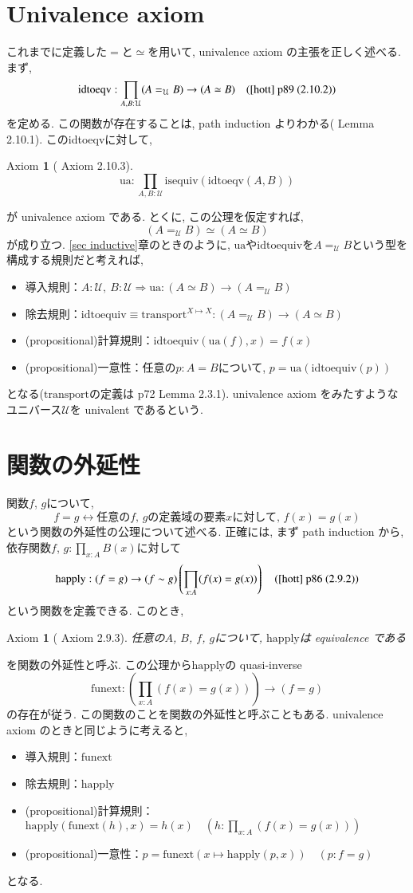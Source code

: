 \documentclass[11pt]{jsreport}
\theoremstyle{mystyle}
\newtheorem{axi}[df]{$\textrm{Axiom}$}
\newcommand{\baxi}{\begin{shadebox} \begin{axi}}
\newcommand{\eaxi}{\end{axi} \end{shadebox}}
\newcommand{\Lra}{\Longrightarrow}
\newcommand{\lra}{\leftrightarrow}
\newcommand{\U}{\mathcal{U}}
\newcommand{\tp}{\textrm{transport}}
\newcommand{\iseq}{\textrm{isequiv}}
\newcommand{\0}{\textbf{0}}
\newcommand{\1}{\textbf{1}}
\newcommand{\2}{\textbf{2}}
\newcommand{\fune}{\textrm{funext}}
\newcommand{\happ}{\textrm{happly}}
\newcommand{\ua}{\textrm{ua}}
\newcommand{\ide}{\textrm{idtoequiv}}
\begin{document}
\section{Univalence axiom} \label{sec ua}
これまでに定義した$=$と$\simeq$を用いて, univalence axiom の主張を正しく述べる. まず, 
\[
  \textrm{idtoeqv} : \prod_{A, B : \U} (A =_{\U} B) \to (A \simeq B)
    \quad (\text{\cite{hott} p89 (2.10.2)})
\]
を定める. この関数が存在することは, path induction よりわかる(\cite{hott} Lemma 2.10.1). このidtoeqvに対して, 
\begin{shadebox}
\begin{axi}[\cite{hott} Axiom 2.10.3]
  \[
    \textrm{ua} : \prod_{A, B : \U} \iseq(\textrm{idtoeqv}(A, B))
  \]
\end{axi}
\end{shadebox}
が univalence axiom である. とくに, この公理を仮定すれば, 
\[
  (A =_{\U} B) \simeq (A \simeq B)
\]
が成り立つ. \ref{sec inductive}章のときのように, $\ua$や$\ide$を$A =_{\U} B$という型を構成する規則だと考えれば, 
\begin{itemize}
  \item 導入規則：$A : \U,\ B: \U \Lra \ua : (A \simeq B) \to (A =_{\U} B)$
  \item 除去規則：$\ide \equiv \tp^{X \mapsto X} : (A =_{\U} B) \to (A \simeq B)$
  \item (propositional)計算規則：$\ide (\ua (f), x) = f(x)$
  \item (propositional)一意性：任意の$p : A = B$について, $p = \ua (\ide (p))$
\end{itemize}
となる($\tp$の定義は\cite{hott} p72 Lemma 2.3.1). univalence axiom をみたすようなユニバース$\U$を univalent であるという.  
\section{関数の外延性} \label{sec funext}
関数$f$, $g$について, 
\[
  f = g \lra \text{任意の$f$, $g$の定義域の要素$x$に対して, $f(x) = g(x)$}
\]
という関数の外延性の公理について述べる. 正確には, まず path induction から, 
依存関数$f$, $g : \prod_{x : A} B(x)$に対して
\[
  \happ : (f = g) \to (f \sim g) \left( \prod_{x : A} (f(x) = g(x))\right)
    \quad (\text{\cite{hott} p86 (2.9.2)})
\]
という関数を定義できる. このとき, 
\baxi[\cite{hott} Axiom 2.9.3]
  任意の$A$, $B$, $f$, $g$について, $\happ$は equivalence である
\eaxi
を関数の外延性と呼ぶ. この公理から$\happ$の quasi-inverse
\[
  \textrm{funext} : \left( \prod_{x : A} (f(x) = g(x)) \right) \to (f = g)
\]
の存在が従う. この関数のことを関数の外延性と呼ぶこともある. univalence axiom のときと同じように考えると,
\begin{itemize}
  \item 導入規則：$\fune$
  \item 除去規則：$\happ$
  \item (propositional)計算規則：$\happ (\fune (h), x) = h(x)
    \quad \left(h : \prod_{x : A} (f(x) = g(x)) \right)$
  \item (propositional)一意性：$p = \fune (x \mapsto \happ(p, x)) \quad (p : f = g)$
\end{itemize}
となる. 
\end{document}
